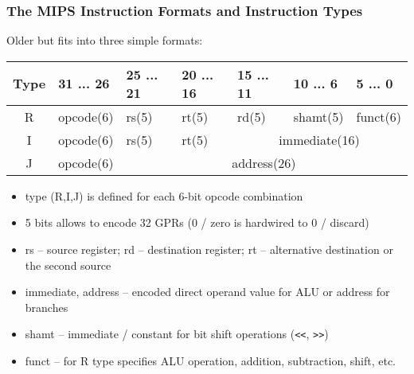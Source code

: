 \documentclass{beamer}
\begin{document}
\begin{frame}
\frametitle{The MIPS Instruction Formats and Instruction Types}

Older but fits into three simple formats:

\begin{tabular}{|c|l|l|l|l|l|l|}\hline
Type & 31 ... 26 & 25 ... 21 & 20 ... 16 & 15 ... 11 & 10 ... 6 & 5 ... 0 \\ \hline
R & opcode(6) & rs(5) & rt(5) & rd(5) & shamt(5) & funct(6) \\ \hline
I & opcode(6) & rs(5) & rt(5) & \multicolumn{3}{c|}{ immediate(16)} \\ \hline
J & opcode(6) & \multicolumn{5}{c|}{ address(26)} \\ \hline
\end{tabular}

\begin{itemize}
\item type (R,I,J) is defined for each 6-bit opcode combination
\item 5 bits allows to encode 32 GPRs (0 / zero is hardwired to 0 / discard)
\item rs -- source register; rd -- destination register; rt -- alternative destination or the second source
\item immediate, address -- encoded direct operand value for ALU or address for branches
\item shamt -- immediate / constant for bit shift operations (\texttt{<<}, \texttt{>>})
\item funct -- for R type specifies ALU operation, addition, subtraction, shift, etc.
\end{itemize}

\end{frame}
\end{document}
